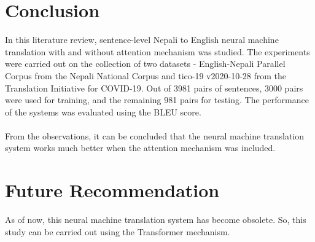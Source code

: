 \section{Conclusion}
In this literature review, sentence-level Nepali to English neural machine translation with and without attention mechanism was studied. The experiments were carried out on the collection of two datasets - English-Nepali Parallel Corpus from the Nepali National Corpus and tico-19 v2020-10-28 from the Translation Initiative for COVID-19. Out of 3981 pairs of sentences, 3000 pairs were used for training, and the remaining 981 pairs for testing. The performance of the systems was evaluated using the BLEU score.
\\\\
From the observations, it can be concluded that the neural machine translation system works much better when the attention mechanism was included.

\section{Future Recommendation}
As of now, this neural machine translation system has become obsolete. So, this study can be carried out using the Transformer mechanism.